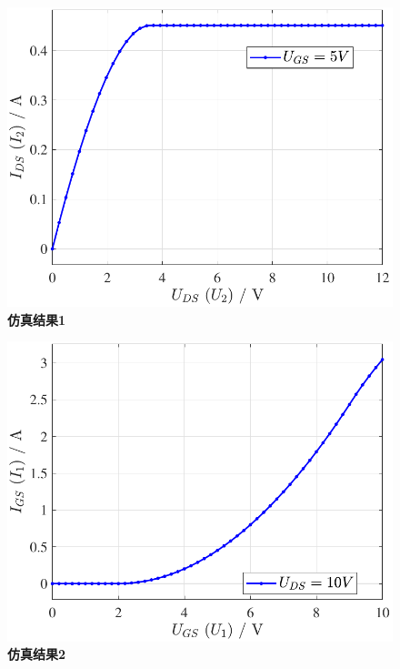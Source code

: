 \documentclass[UTF8]{report}
\theoremstyle{MyLineTheoremStyle} %
\theoremstyle{MyBlockTheoremStyle} %
\theoremstyle{MySubsubsectionStyle} %
\begin{document}
\begin{center}
    \noindent\begin{minipage}{0.42\textwidth}
        \begin{figure}[H]\centering
        \includegraphics[width=\textwidth]{assets/1/2024-08-30_00-57-32.pdf}
        \caption{\textbf{仿真结果1}}\label{仿真结果1}
        \end{figure}
    \end{minipage}\hspace{5mm}
    \begin{minipage}{0.42\textwidth}
        \begin{figure}[H]\centering
        \includegraphics[width=\textwidth]{assets/1/2024-08-30_00-57-34.pdf}
    \caption{\textbf{仿真结果2}}\label{仿真结果2}
    \end{figure}
    \end{minipage}
\end{center}
\end{document}
